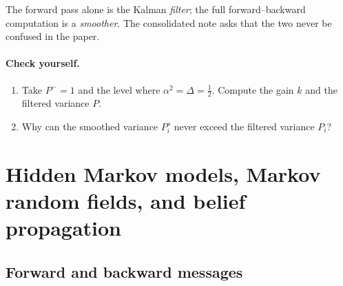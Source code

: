 \begin{caution}
The forward pass alone is the Kalman \emph{filter}; the full forward--backward computation is a
\emph{smoother}. The consolidated note asks that the two never be confused in the paper.
\end{caution}

\paragraph{Check yourself.}
\begin{enumerate}[label=\thesection.\arabic*,leftmargin=2.2em]
\item Take $P^-=1$ and the level where $\alpha^2=\Delta=\tfrac12$. Compute the gain $k$ and the filtered variance $P$.
\item Why can the smoothed variance $P_i^s$ never exceed the filtered variance $P_i$?
\end{enumerate}

\section{Hidden Markov models, Markov random fields, and belief propagation}\label{sec:bp}

\subsection{Forward and backward messages}

